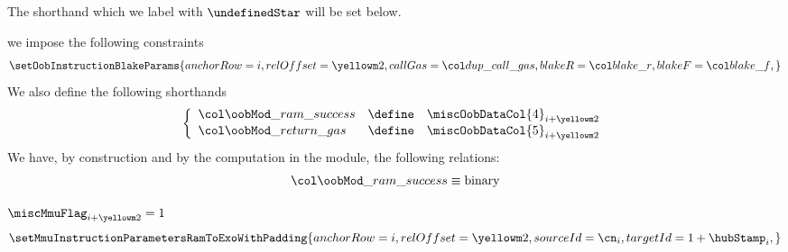 \begin{description}
\begin{description}
				\saNote{} The shorthand \locOobResultRamSuccess{} which we label with $\undefinedStar$ will be set below.
			\item[\underline{Setting \oobMod{} values and shorthands:}] 
				we impose the following constraints
				\[
					\setOobInstructionBlakeParams {
						anchorRow = i                            ,
						relOffset = \prcBlakeSecondMiscRowOffset ,
						callGas   = \locPrcCallGas               ,
						blakeR    = \locBlakeR                   ,
						blakeF    = \locBlakeF                   ,
					}
					\label{hub: instruction handling: call: precompiles: blake: hub success call}
				\]
				We also define the following shorthands
				\[
					\left\{ \begin{array}{lcl} \label{hub: instruction handling: call: precompiles: blake: shorthands}
						\locOobResultRamSuccess      & \define & \miscOobDataCol{4}_{i + \prcBlakeSecondMiscRowOffset} \\
						\locOobResultReturnGas       & \define & \miscOobDataCol{5}_{i + \prcBlakeSecondMiscRowOffset} \\
					\end{array} \right.
				\]
				\saNote{} We have, by construction and by the computation in the \oobMod{} module, the following relations:
				\[
					\locOobResultRamSuccess \equiv \text{binary} 
				\]
			\item[\underline{Setting \mmuMod{} values:}]
				\If $\miscMmuFlag_{i + \prcBlakeSecondMiscRowOffset} = 1$ \Then
				\[
					\setMmuInstructionParametersRamToExoWithPadding {
						anchorRow       = i                                ,
						relOffset       = \prcBlakeSecondMiscRowOffset     ,
						sourceId        = \cn_{i}                          ,
						targetId        = 1 + \hubStamp_{i}                ,
}\]
\end{description}
\end{description}
